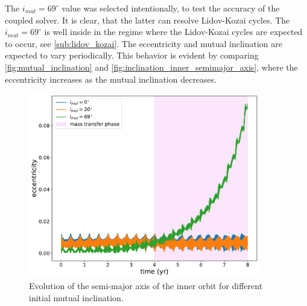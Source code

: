The $i_{mut}=69^{\circ}$ value was selected intentionally, to test the accuracy of the coupled solver. It is clear, that the latter can resolve Lidov-Kozai cycles. The $i_{mut}=69^{\circ}$ is well inside in the regime where the Lidov-Kozai cycles are expected to occur, see \cref{sub:lidov_kozai}. The eccentricity and mutual inclination are expected to vary periodically. This behavior is evident by comparing \cref{fig:mutual_inclination} and \cref{fig:inclination_inner_semimajor_axis}, where the eccentricity increases as the mutual inclination decreases. 
\begin{figure}[!htb]
    \centering
    \includegraphics[width=0.9\textwidth]{Thesis/graphs/inclination_case/inclination_inner_ecc.pdf}
    \caption{Evolution of the semi-major axis of the inner orbit for different initial mutual inclination.}
    \label{fig:inclination_inner_ecc}
\end{figure}
